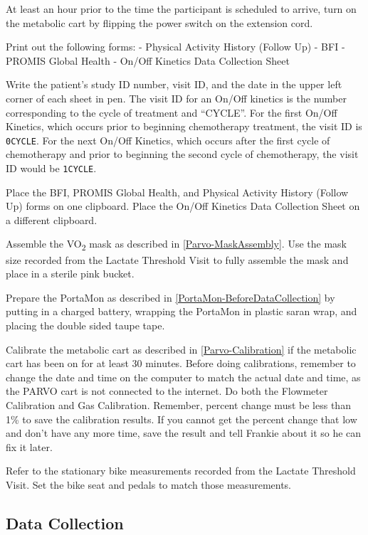 \documentclass[
]{book}
\begin{document}
At least an hour prior to the time the participant is scheduled to arrive, turn on the metabolic cart by flipping the power switch on the extension cord.

Print out the following forms:
- Physical Activity History (Follow Up)
- BFI
- PROMIS Global Health
- On/Off Kinetics Data Collection Sheet

Write the patient's study ID number, visit ID, and the date in the upper left corner of each sheet in pen. The visit ID for an On/Off kinetics is the number corresponding to the cycle of treatment and ``CYCLE''.
For the first On/Off Kinetics, which occurs prior to beginning chemotherapy treatment, the visit ID is \texttt{0CYCLE}. For the next On/Off Kinetics, which occurs after the first cycle of chemotherapy and prior to beginning the second cycle of chemotherapy, the visit ID would be \texttt{1CYCLE}.

Place the BFI, PROMIS Global Health, and Physical Activity History (Follow Up) forms on one clipboard. Place the On/Off Kinetics Data Collection Sheet on a different clipboard.

Assemble the VO\textsubscript{2} mask as described in \ref{Parvo-MaskAssembly}. Use the mask size recorded from the Lactate Threshold Visit to fully assemble the mask and place in a sterile pink bucket.

Prepare the PortaMon as described in \ref{PortaMon-BeforeDataCollection} by putting in a charged battery, wrapping the PortaMon in plastic saran wrap, and placing the double sided taupe tape.

Calibrate the metabolic cart as described in \ref{Parvo-Calibration} if the metabolic cart has been on for at least 30 minutes. Before doing calibrations, remember to change the date and time on the computer to match the actual date and time, as the PARVO cart is not connected to the internet. Do both the Flowmeter Calibration and Gas Calibration. Remember, percent change must be less than 1\% to save the calibration results. If you cannot get the percent change that low and don't have any more time, save the result and tell Frankie about it so he can fix it later.

Refer to the stationary bike measurements recorded from the Lactate Threshold Visit. Set the bike seat and pedals to match those measurements.

\hypertarget{Methods-OnOff-DataCollection}{%
\subsection{Data Collection}\label{Methods-OnOff-DataCollection}}
\end{document}
